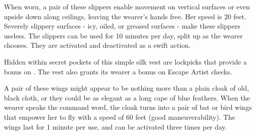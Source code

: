  When worn, a pair of these slippers enable movement on vertical surfaces or even upside down along ceilings, leaving the wearer's hands free. Her speed is 20 feet. Severely slippery surfaces - icy, oiled, or greased surfaces -  make these slippers useless. The slippers can be used for 10 minutes per day, split up as the wearer chooses. They are activated and deactivated as a swift action.


 Hidden within secret pockets of this simple silk vest are lockpicks that provide a  bonus on . The vest also grants its wearer a  bonus on Escape Artist checks.

\begin{comment}
\itemdescription{Vestment, Druid's} This light garment is worn over normal clothing or armor. Most such vestments are green, embroidered with plant or animal motifs. When this item is worn by a character with the wild shape ability, the character can use that ability one additional time each day.

Moderate transmutation; CL 10th; Craft Wondrous Item, polymorph or wild shape ability; Price 10,000 gp.
\end{comment}

 A pair of these wings might appear to be nothing more than a plain cloak of old, black cloth, or they could be as elegant as a long cape of blue feathers. When the wearer speaks the command word, the cloak turns into a pair of bat or bird wings that empower her to fly with a speed of 60 feet (good maneuverability). The wings last for 1 minute per use, and can be activated three times per day.
